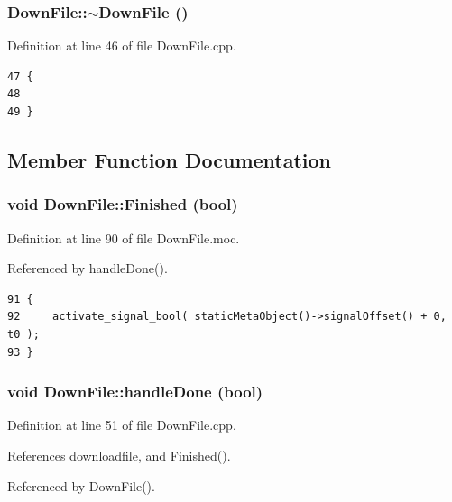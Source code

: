 \subsubsection{\setlength{\rightskip}{0pt plus 5cm}Down\-File::$\sim${\bf Down\-File} ()}\label{classDownFile_DownFilea1}




Definition at line 46 of file Down\-File.cpp.



\footnotesize\begin{verbatim}47 {
48 
49 }
\end{verbatim}\normalsize 


\subsection{Member Function Documentation}
\subsubsection{\setlength{\rightskip}{0pt plus 5cm}void Down\-File::Finished (bool)\hspace{0.3cm}{\tt  [signal]}}\label{classDownFile_DownFilel0}




Definition at line 90 of file Down\-File.moc.

Referenced by handle\-Done().



\footnotesize\begin{verbatim}91 {
92     activate_signal_bool( staticMetaObject()->signalOffset() + 0, t0 );
93 }
\end{verbatim}\normalsize 
{}
\subsubsection{\setlength{\rightskip}{0pt plus 5cm}void Down\-File::handle\-Done (bool)\hspace{0.3cm}{\tt  [slot]}}\label{classDownFile_DownFilei0}




Definition at line 51 of file Down\-File.cpp.

References downloadfile, and Finished().

Referenced by Down\-File().



